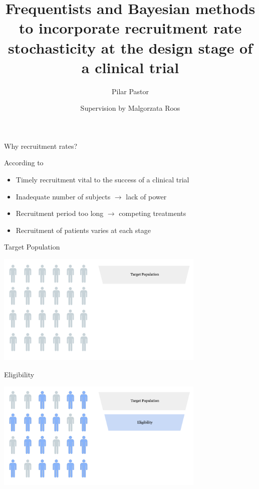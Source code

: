 \documentclass[english]{beamer}\usepackage[]{graphicx}\usepackage[]{xcolor}
\title[Recruitment rate stochasticity
at the design stage of a clinical trial]{Frequentists and Bayesian methods to incorporate
recruitment rate stochasticity
at the design stage of a clinical trial}
\author{Supervision by Malgorzata Roos}
\subtitle{Pilar Pastor}
\begin{document}
\maketitle


\begin{frame}{Why recruitment rates?}

According to \cite{carter2004application}
\begin{itemize}
\item Timely recruitment vital to the success of a clinical trial
\item Inadequate number of subjects $\rightarrow$ lack of power
\item Recruitment period too long $\rightarrow$ competing treatments
\item Recruitment of patients varies at each stage 
\end{itemize}


\end{frame}


\begin{frame}{Target Population}

\includegraphics[width=100mm,scale=1]{targetpop.png}

\end{frame}

\begin{frame}{Eligibility}

\includegraphics[width=100mm,scale=1]{eligibility.png}

\end{frame}
\end{document}
